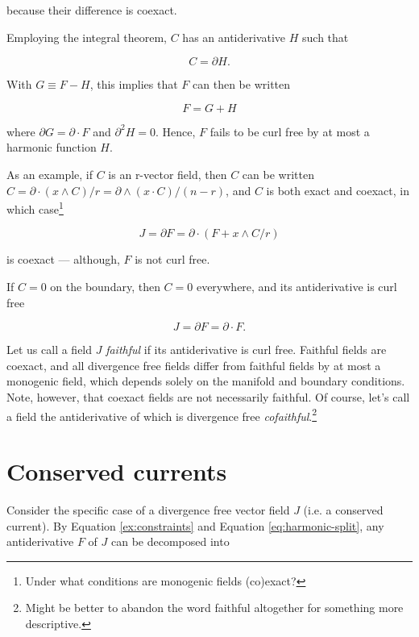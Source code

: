 \documentclass{article}
\begin{document}
because their difference is coexact.

Employing the integral theorem, $C$ has an antiderivative $H$ such that 

\begin{equation}
  C = \partial H.
\end{equation}

With $G \equiv F - H$, this implies that $F$ can then be written

\begin{equation}
  F = G + H\label{eq:harmonic-split}
\end{equation}

where $\partial G = \partial \cdot F$ and $\partial^2 H = 0$. Hence, $F$ fails to be curl free by at most a harmonic function $H$.

As an example, if $C$ is an r-vector field, then $C$ can be written $C = \partial \cdot (x \wedge C)/r = \partial \wedge (x \cdot C)/(n-r)$, and $C$ is both exact and coexact, in which case\footnote{Under what conditions are monogenic fields (co)exact?}

\begin{equation}
  J = \partial F = \partial \cdot (F + x \wedge C/r)\label{eq:unfaithful}
\end{equation}

is coexact --- although, $F$ is not curl free. 

If $C = 0$ on the boundary, then $C = 0$ everywhere, and its antiderivative is curl free

\begin{equation}
  J = \partial F = \partial \cdot F. \label{eq:faithful}
\end{equation}

Let us call a field $J$ \emph{faithful} if its antiderivative is curl free. Faithful fields are coexact, and all divergence free fields differ from faithful fields by at most a monogenic field, which depends solely on the manifold and boundary conditions. Note, however, that coexact fields are not necessarily faithful. Of course, let's call a field the antiderivative of which is divergence free \emph{cofaithful}.\footnote{Might be better to abandon the word faithful altogether for something more descriptive.}

\section{Conserved currents}

Consider the specific case of a divergence free vector field $J$ (i.e. a conserved current). By Equation \ref{ex:constraints} and Equation \ref{eq:harmonic-split}, any antiderivative $F$ of $J$ can be decomposed into 
\end{document}

